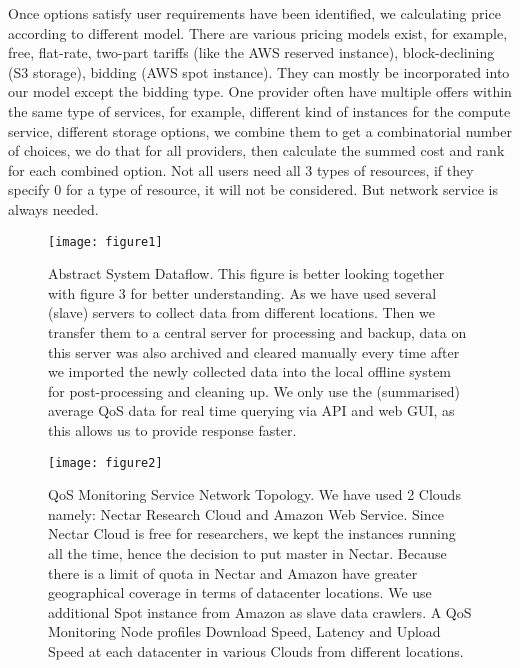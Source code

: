 \documentclass[journal]{IEEEtran}
\begin{document}
Once options satisfy user requirements have been identified, we calculating price according to different model. There are various pricing models    \cite{weinman2011axiomatic} exist, for example, free, flat-rate, two-part tariffs (like the AWS reserved instance), block-declining (S3 storage), bidding (AWS spot instance). They can mostly be incorporated into our model except the bidding type. One provider often have multiple offers within the same type of services, for example, different kind of instances for the compute service, different storage options, we combine them to get a combinatorial number of choices, we do that for all providers, then calculate the summed cost and rank for each combined option. Not all users need all 3 types of resources, if they specify 0 for a type of resource, it will not be considered. But network service is always needed.


\begin{figure}[!h]
 \centering
 \texttt{[image: figure1]}
 \caption{Abstract System Dataflow. This figure is better looking together with figure 3 for better understanding. As we have used several (slave) servers to collect data from different locations. Then we transfer them to a central server for processing and backup, data on this server was also archived and cleared manually every time after we imported the newly collected data into the local offline system for post-processing and cleaning up. We only use the (summarised) average QoS data for real time querying via API and web GUI, as this allows us to provide response faster.}
\label{fig1}
\end{figure}

\begin{figure}[!h]
 \centering
 \texttt{[image: figure2]}
 \caption{QoS Monitoring Service Network Topology. We have used 2 Clouds namely: Nectar Research Cloud and Amazon Web Service. Since Nectar Cloud is free for researchers, we kept the instances running all the time, hence the decision to put master in Nectar. Because there is a limit of quota in Nectar and Amazon have greater geographical coverage in terms of datacenter locations. We use additional Spot instance from Amazon as slave data crawlers. A QoS Monitoring Node profiles Download Speed, Latency and Upload Speed at each datacenter in various Clouds from different locations.}
\label{fig2}
\end{figure}
\end{document}
